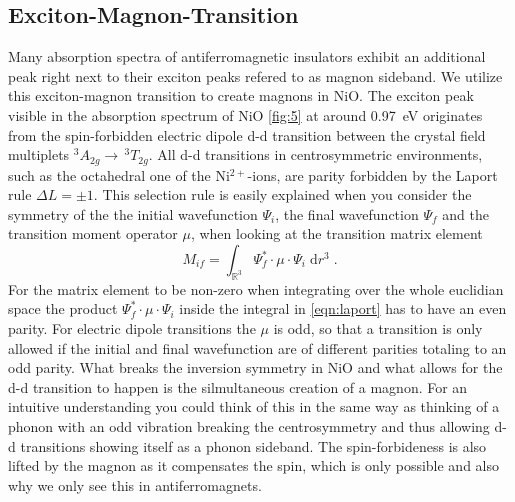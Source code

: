 \subsection{Exciton-Magnon-Transition}
\label{sec:x_m}
Many absorption spectra of antiferromagnetic insulators exhibit an additional peak right next to their exciton peaks  refered to as magnon sideband.
We utilize this exciton-magnon transition to create magnons in NiO.
The exciton peak visible in the absorption spectrum of NiO \autoref{fig:5} at around \qty{0.97}{eV} originates from the spin-forbidden electric dipole d-d transition between the crystal field multiplets $^3A_{2g} \rightarrow \, ^3T_{2g}$.
All d-d transitions in centrosymmetric environments, such as the octahedral one of the Ni$^{2+}$-ions, are parity forbidden by the Laport rule $\Delta L = \pm 1$.
This selection rule is easily explained when you consider the symmetry of the the initial wavefunction $\Psi_i$, the final wavefunction $\Psi_f$ and the transition moment operator $\mu$, when looking at the transition matrix element
\begin{equation}
    M_{if} = \int_{\mathbb{R}^3} \Psi^*_f \cdot \mu \cdot \Psi_i \;\text{d}r^3 \;.
    \label{eqn:laport}
\end{equation}
For the matrix element to be non-zero when integrating over the whole euclidian space the product $\Psi^*_f \cdot \mu \cdot \Psi_i$ inside the integral in \autoref{eqn:laport} has to have an even parity.
For electric dipole transitions the $\mu$ is odd, so that a transition is only allowed if the initial and final wavefunction are of different parities totaling to an odd parity.
What breaks the inversion symmetry in NiO and what allows for the d-d transition to happen is the silmultaneous creation of a magnon.
For an intuitive understanding you could think of this in the same way as thinking of a phonon with an odd vibration breaking the centrosymmetry and thus allowing d-d transitions showing itself as a phonon sideband.
The spin-forbideness is also lifted by the magnon as it compensates the spin, which is only possible and also why we only see this in antiferromagnets.
